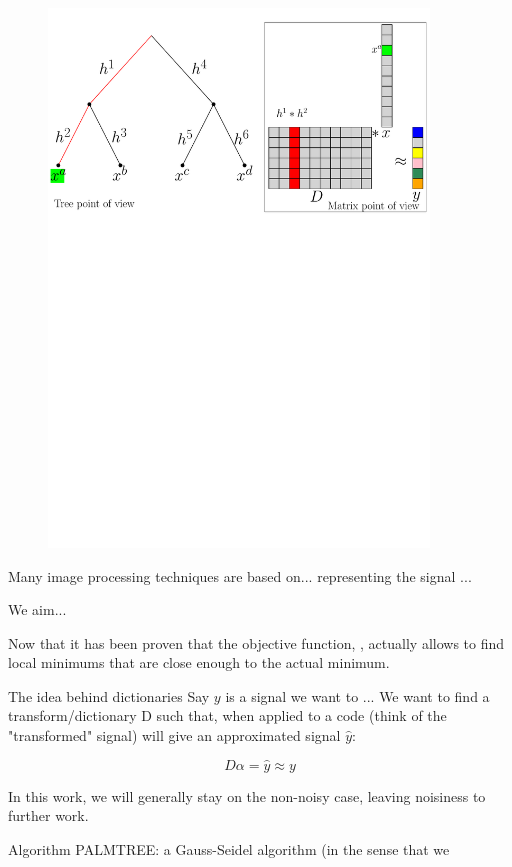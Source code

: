 \begin{figure} \centering
\includegraphics[width=0.9\textwidth]{figures/matrix-vs-tree.pdf} \label{matrix_vs_tree}
\end{figure}


Many image processing techniques are based on... representing the signal ...

We aim... 

Now that it has been proven that the objective function, , actually allows to find local minimums that are close enough to the actual minimum.


The idea behind dictionaries
Say $y$ is a signal we want to ...
We want to find a transform/dictionary D such that, when applied to a code (think of the "transformed" signal) will give an approximated signal $\hat{y}$:

$$D\alpha=\hat{y} \approx y$$

In this work, we will generally stay on the non-noisy case, leaving noisiness to further work.

Algorithm PALMTREE: a Gauss-Seidel algorithm (in the sense that we 

